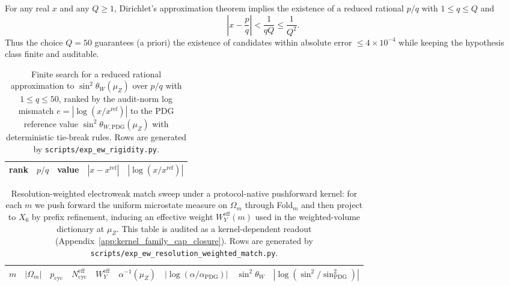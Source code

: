 \begin{remark}\label{rem:ew_sin2_denominator_nonvacuous}
For any real $x$ and any $Q\ge 1$, Dirichlet's approximation theorem implies the existence of a reduced rational $p/q$ with $1\le q\le Q$ and
\[
\left|x-\frac{p}{q}\right|<\frac{1}{qQ}\le \frac{1}{Q^2}.
\]
Thus the choice $Q=50$ guarantees (a priori) the existence of candidates within absolute error $\le 4\times 10^{-4}$ while keeping the hypothesis class finite and auditable.
\end{remark}

\begin{table}[H]
\centering
\scriptsize
\setlength{\tabcolsep}{8pt}
\renewcommand{\arraystretch}{1.15}
\begin{tabular}{rlrrr}
\toprule
rank & $p/q$ & value & $|x-x^{\mathrm{ref}}|$ & $|\log(x/x^{\mathrm{ref}})|$ \\
\midrule
%
\end{tabular}
\caption{Finite search for a reduced rational approximation to $\sin^2\theta_W(\mu_Z)$ over $p/q$ with $1\le q\le 50$, ranked by the audit-norm log mismatch $e=|\log(x/x^{\mathrm{ref}})|$ to the PDG reference value $\sin^2\theta_{W,\mathrm{PDG}}(\mu_Z)$ with deterministic tie-break rules. Rows are generated by \texttt{scripts/exp\_ew\_rigidity.py}.}
\label{tab:ew_sin2_rational_rigidity}
\end{table}

\begin{table}[H]
\centering
\scriptsize
\setlength{\tabcolsep}{6pt}
\renewcommand{\arraystretch}{1.15}
\begin{tabular}{rrrrrrrrr}
\toprule
$m$ & $|\Omega_m|$ & $p_{\mathrm{cyc}}$ & $N^{\mathrm{eff}}_{\mathrm{cyc}}$ & $W_Y^{\mathrm{eff}}$ &
$\alpha^{-1}(\mu_Z)$ & $|\log(\alpha/\alpha_{\mathrm{PDG}})|$ & $\sin^2\theta_W$ & $|\log(\sin^2/\sin^2_{\mathrm{PDG}})|$ \\
\midrule
%
\end{tabular}
\caption{Resolution-weighted electroweak match sweep under a protocol-native pushforward kernel: for each $m$ we push forward the uniform microstate measure on $\Omega_m$ through Fold$_m$ and then project to $X_6$ by prefix refinement, inducing an effective weight $W_Y^{\mathrm{eff}}(m)$ used in the weighted-volume dictionary at $\mu_Z$.
This table is audited as a kernel-dependent readout (Appendix~\ref{app:kernel_family_cap_closure}).
Rows are generated by \texttt{scripts/exp\_ew\_resolution\_weighted\_match.py}.}
\label{tab:ew_resolution_weighted_match}
\end{table}

